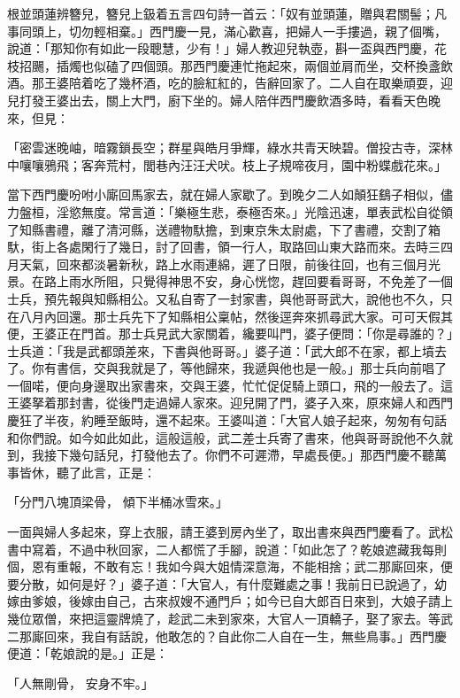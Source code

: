 根並頭蓮辨簪兒，簪兒上鈒着五言四句詩一首云：「奴有並頭蓮，贈與君關髻；凡事同頭上，切勿輕相棄。」西門慶一見，滿心歡喜，把婦人一手摟過，親了個嘴，說道：「那知你有如此一段聰慧，少有！」婦人教迎兒執壺，斟一盃與西門慶，花枝招颺，插燭也似磕了四個頭。那西門慶連忙拖起來，兩個並肩而坐，交杯換盞飲酒。那王婆陪着吃了幾杯酒，吃的臉紅紅的，告辭回家了。二人自在取樂頑耍，迎兒打發王婆出去，關上大門，廚下坐的。婦人陪伴西門慶飲酒多時，看看天色晚來，但見：

「密雲迷晚岫，暗霧鎖長空；群星與皓月爭輝，綠水共青天映碧。僧投古寺，深林中嚷嚷鴉飛；客奔荒村，閭巷內汪汪犬吠。枝上子規啼夜月，園中粉蝶戲花來。」

當下西門慶吩咐小廝回馬家去，就在婦人家歇了。到晚夕二人如顛狂鷂子相似，儘力盤桓，淫慾無度。常言道：「樂極生悲，泰極否來。」光陰迅速，單表武松自從領了知縣書禮，離了清河縣，送禮物馱擔，到東京朱太尉處，下了書禮，交割了箱馱，街上各處閑行了幾日，討了回書，領一行人，取路回山東大路而來。去時三四月天氣，回來都淡暑新秋，路上水雨連綿，遲了日限，前後往回，也有三個月光景。在路上雨水所阻，只覺得神思不安，身心恍惚，趕回要看哥哥，不免差了一個士兵，預先報與知縣相公。又私自寄了一封家書，與他哥哥武大，說他也不久，只在八月內回還。那士兵先下了知縣相公稟帖，然後逕奔來抓尋武大家。可可天假其便，王婆正在門首。那士兵見武大家關着，纔要叫門，婆子便問：「你是尋誰的？」士兵道：「我是武都頭差來，下書與他哥哥。」婆子道：「武大郎不在家，都上墳去了。你有書信，交與我就是了，等他歸來，我遞與他也是一般。」那士兵向前唱了一個喏，便向身邊取出家書來，交與王婆，忙忙促促騎上頭口，飛的一般去了。這王婆拏着那封書，從後門走過婦人家來。迎兒開了門，婆子入來，原來婦人和西門慶狂了半夜，約睡至飯時，還不起來。王婆叫道：「大官人娘子起來，匆匆有句話和你們說。如今如此如此，這般這般，武二差士兵寄了書來，他與哥哥說他不久就到，我接下幾句話兒，打發他去了。你們不可遲滯，早處長便。」那西門慶不聽萬事皆休，聽了此言，正是：

「分門八塊頂梁骨，  傾下半桶冰雪來。」

一面與婦人多起來，穿上衣服，請王婆到房內坐了，取出書來與西門慶看了。武松書中寫着，不過中秋回家，二人都慌了手腳，說道：「如此怎了？乾娘遮藏我每則個，恩有重報，不敢有忘！我如今與大姐情深意海，不能相捨；武二那廝回來，便要分散，如何是好？」婆子道：「大官人，有什麼難處之事！我前日已說過了，幼嫁由爹娘，後嫁由自己，古來叔嫂不通門戶；如今已自大郎百日來到，大娘子請上幾位眾僧，來把這靈牌燒了，趁武二未到家來，大官人一頂轎子，娶了家去。等武二那廝回來，我自有話說，他敢怎的？自此你二人自在一生，無些鳥事。」西門慶便道：「乾娘說的是。」正是：

「人無剛骨，  安身不牢。」

